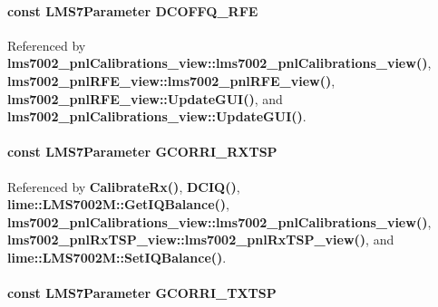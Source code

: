 \paragraph[{D\+C\+O\+F\+F\+Q\+\_\+\+R\+FE}]{\setlength{\rightskip}{0pt plus 5cm}const {\bf L\+M\+S7\+Parameter} D\+C\+O\+F\+F\+Q\+\_\+\+R\+FE}\label{LMS7002M__parameters__compact_8h_afc0185eaaa18f32eecf8e5e97c967d4e}


Referenced by {\bf lms7002\+\_\+pnl\+Calibrations\+\_\+view\+::lms7002\+\_\+pnl\+Calibrations\+\_\+view()}, {\bf lms7002\+\_\+pnl\+R\+F\+E\+\_\+view\+::lms7002\+\_\+pnl\+R\+F\+E\+\_\+view()}, {\bf lms7002\+\_\+pnl\+R\+F\+E\+\_\+view\+::\+Update\+G\+U\+I()}, and {\bf lms7002\+\_\+pnl\+Calibrations\+\_\+view\+::\+Update\+G\+U\+I()}.

\paragraph[{G\+C\+O\+R\+R\+I\+\_\+\+R\+X\+T\+SP}]{\setlength{\rightskip}{0pt plus 5cm}const {\bf L\+M\+S7\+Parameter} G\+C\+O\+R\+R\+I\+\_\+\+R\+X\+T\+SP}\label{LMS7002M__parameters__compact_8h_ae9298d0fb5d1f36cf26c96fdd3bac6b2}


Referenced by {\bf Calibrate\+Rx()}, {\bf D\+C\+I\+Q()}, {\bf lime\+::\+L\+M\+S7002\+M\+::\+Get\+I\+Q\+Balance()}, {\bf lms7002\+\_\+pnl\+Calibrations\+\_\+view\+::lms7002\+\_\+pnl\+Calibrations\+\_\+view()}, {\bf lms7002\+\_\+pnl\+Rx\+T\+S\+P\+\_\+view\+::lms7002\+\_\+pnl\+Rx\+T\+S\+P\+\_\+view()}, and {\bf lime\+::\+L\+M\+S7002\+M\+::\+Set\+I\+Q\+Balance()}.

\paragraph[{G\+C\+O\+R\+R\+I\+\_\+\+T\+X\+T\+SP}]{\setlength{\rightskip}{0pt plus 5cm}const {\bf L\+M\+S7\+Parameter} G\+C\+O\+R\+R\+I\+\_\+\+T\+X\+T\+SP}\label{LMS7002M__parameters__compact_8h_a9d762a9a770cf44b63e8eea21072b879}


